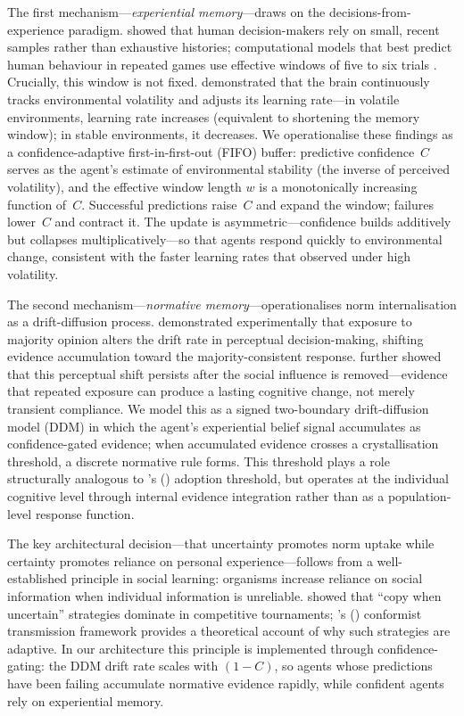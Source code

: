 \documentclass[11pt,a4paper]{article}
\begin{document}
The first mechanism---\emph{experiential memory}---draws on the decisions-from-experience paradigm. \citet{hertwig2010decisions} showed that human decision-makers rely on small, recent samples rather than exhaustive histories; computational models that best predict human behaviour in repeated games use effective windows of five to six trials \citep{nevo2012bi}. Crucially, this window is not fixed. \citet{behrens2007learning} demonstrated that the brain continuously tracks environmental volatility and adjusts its learning rate---in volatile environments, learning rate increases (equivalent to shortening the memory window); in stable environments, it decreases. We operationalise these findings as a confidence-adaptive first-in-first-out (FIFO) buffer: predictive confidence~$C$ serves as the agent's estimate of environmental stability (the inverse of perceived volatility), and the effective window length $w$ is a monotonically increasing function of~$C$. Successful predictions raise~$C$ and expand the window; failures lower~$C$ and contract it. The update is asymmetric---confidence builds additively but collapses multiplicatively---so that agents respond quickly to environmental change, consistent with the faster learning rates that \citeauthor{behrens2007learning} observed under high volatility.

The second mechanism---\emph{normative memory}---operationalises norm internalisation as a drift-diffusion process. \citet{germar2014social} demonstrated experimentally that exposure to majority opinion alters the drift rate in perceptual decision-making, shifting evidence accumulation toward the majority-consistent response. \citet{germar2019learning} further showed that this perceptual shift persists after the social influence is removed---evidence that repeated exposure can produce a lasting cognitive change, not merely transient compliance. We model this as a signed two-boundary drift-diffusion model (DDM) in which the agent's experiential belief signal accumulates as confidence-gated evidence; when accumulated evidence crosses a crystallisation threshold, a discrete normative rule forms. This threshold plays a role structurally analogous to \citeauthor{granovetter1978threshold}'s (\citeyear{granovetter1978threshold}) adoption threshold, but operates at the individual cognitive level through internal evidence integration rather than as a population-level response function.

The key architectural decision---that uncertainty promotes norm uptake while certainty promotes reliance on personal experience---follows from a well-established principle in social learning: organisms increase reliance on social information when individual information is unreliable. \citet{rendell2010copy} showed that ``copy when uncertain'' strategies dominate in competitive tournaments; \citeauthor{boyd1985culture}'s (\citeyear{boyd1985culture}) conformist transmission framework provides a theoretical account of why such strategies are adaptive. In our architecture this principle is implemented through confidence-gating: the DDM drift rate scales with $(1-C)$, so agents whose predictions have been failing accumulate normative evidence rapidly, while confident agents rely on experiential memory.
\end{document}

